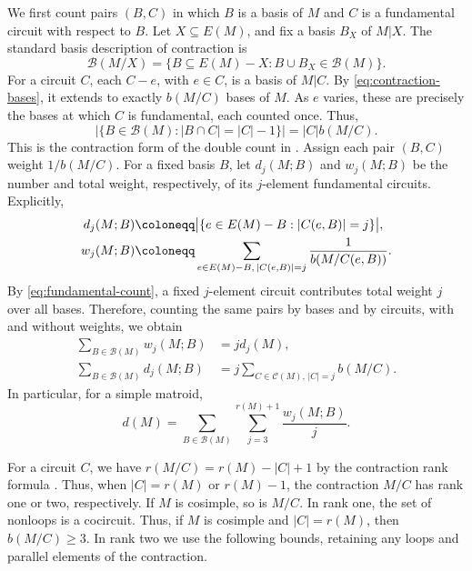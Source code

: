 \documentclass[10pt,a4paper]{article}
\numberwithin{equation}{section}
\newcommand{\BB}{\mathcal B}
\newcommand{\CC}{\mathcal C}
\newcommand{\wloc}[1]{w_{#1}(M;B)}
\newcommand{\dloc}[1]{d_{#1}(M;B)}
\begin{document}
We first count pairs \((B,C)\) in which \(B\) is a basis of
\(M\) and \(C\) is a fundamental circuit with respect to \(B\).
Let \(X\subseteq E(M)\), and fix a basis \(B_X\) of \(M|X\).
The standard basis description of contraction
\cite[Corollary~3.1.8]{Oxley2011} is
\begin{equation}\label{eq:contraction-bases}
 \BB(M/X)=\{B\subseteq E(M)-X:B\cup B_X\in\BB(M)\}.
\end{equation}
For a circuit \(C\), each \(C-e\), with \(e\in C\), is a basis
of \(M|C\). By \eqref{eq:contraction-bases}, it extends to
exactly \(b(M/C)\) bases of \(M\). As \(e\) varies, these are
precisely the bases at which \(C\) is fundamental, each counted once.
Thus,
\begin{equation}\label{eq:fundamental-count}
 \bigl|\{B\in\BB(M):|B\cap C|=|C|-1\}\bigr|=|C|b(M/C).
\end{equation}
This is the contraction form of the double count in
\cite[proof of Theorem~1.1]{Oxley1983}.
Assign each pair \((B,C)\) weight \(1/b(M/C)\).
For a fixed basis \(B\), let \(\dloc{j}\) and \(\wloc{j}\)
be the number and total weight, respectively, of its
\(j\)-element fundamental circuits.
Explicitly,
\begin{align}
 \dloc{j}&\coloneqq\bigl|\{e\in E(M)-B:|C(e,B)|=j\}\bigr|,
 \notag\\
 \wloc{j}&\coloneqq\sum_{e\in E(M)-B,\,|C(e,B)|=j}
 \frac1{b(M/C(e,B))}.
 \label{eq:local-weight}
\end{align}
By \eqref{eq:fundamental-count}, a fixed \(j\)-element circuit
contributes total weight \(j\) over all bases.
Therefore, counting the same pairs by bases and by circuits,
with and without weights, we obtain
\begin{align}
 \sum_{B\in\BB(M)}\wloc{j}&=j d_j(M),
 \label{eq:weight-total}\\
 \sum_{B\in\BB(M)}\dloc{j}
 &=j\sum_{C\in\CC(M),\,|C|=j}b(M/C).
 \label{eq:count-total}
\end{align}
In particular, for a simple matroid,
\begin{equation*}
 d(M)=\sum_{B\in\BB(M)}\sum_{j=3}^{r(M)+1}\frac{\wloc{j}}j.
\end{equation*}

For a circuit \(C\), we have \(r(M/C)=r(M)-|C|+1\)
by the contraction rank formula \cite[Proposition~3.1.6]{Oxley2011}.
Thus, when \(|C|=r(M)\) or \(r(M)-1\), the contraction \(M/C\)
has rank one or two, respectively. If \(M\) is cosimple, so is
\(M/C\). In rank one, the set of nonloops is a cocircuit.
Thus, if \(M\) is cosimple and \(|C|=r(M)\), then \(b(M/C)\ge3\).
In rank two we use the following bounds, retaining any loops and
parallel elements of the contraction.
\end{document}
